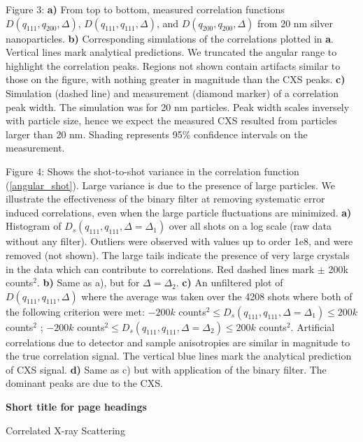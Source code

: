 \documentclass [11pt,fleqn]{article}
\begin{document}
Figure 3:
{\bf a)} From top to bottom, measured correlation functions $D (q_{111},q_{200}, \Delta  )$, $D (q_{111},q_{111}, \Delta  )$, and $D (q_{200},q_{200}, \Delta  )$ from 20 nm silver nanoparticles. {\bf b)} Corresponding simulations of the correlations plotted in {\bf a}. Vertical lines mark analytical predictions. We truncated the angular range to highlight the correlation peaks. Regions not shown contain artifacts similar to those on the figure, with nothing greater in magnitude than the CXS peaks. {\bf c)} Simulation (dashed line) and measurement (diamond marker) of a correlation peak width. The simulation was for 20 nm particles. Peak width scales inversely with particle size, hence we expect the measured CXS resulted from particles larger than 20 nm. Shading represents 95\% confidence intervals on the measurement.

Figure 4:
Shows the shot-to-shot variance in the correlation function (\ref{angular_shot}). Large variance is due to the presence of large particles. We illustrate the effectiveness of the binary filter at removing systematic error induced correlations, even when the large particle fluctuations are minimized. {\bf a)} Histogram of $D_s(q_{111}, q_{111}, \Delta = \Delta_1)$ over all shots on a log scale (raw data without any filter). Outliers were observed with values up to order 1e8, and were removed (not shown). The large tails indicate the presence of very large crystals in the data which can contribute to correlations. Red dashed lines mark $\pm$ 200k counts$^2$. {\bf b)} Same as a), but for $\Delta = \Delta_2$. {\bf c)} An unfiltered plot of $D(q_{111}, q_{111}, \Delta)$ where the average was taken over the 4208 shots where both of the following criterion were met: $-200k $ counts$^2 \le D_s(q_{111}, q_{111}, \Delta = \Delta_1) \le 200k$ counts$^2$ ; $-200k $ counts$^2 \le D_s(q_{111}, q_{111}, \Delta = \Delta_2) \le 200k$ counts$^2$. Artificial correlations due to detector and sample anisotropies are similar in magnitude to the true correlation signal. The vertical blue lines mark the analytical prediction of CXS signal. {\bf d)} Same as c) but with application of the binary filter. The dominant peaks are due to the CXS.

{\bf Short title for page headings}

Correlated X-ray Scattering
\end{document}
